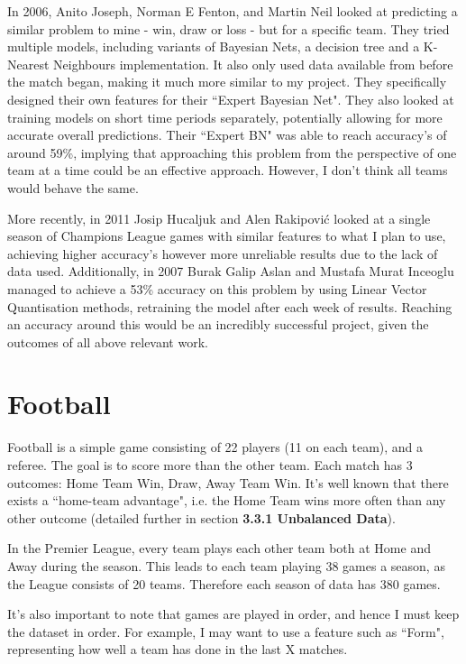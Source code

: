 \documentclass[12pt,a4paper,twoside,openright]{report}
\begin{document}
In 2006, Anito Joseph, Norman E Fenton, and Martin Neil\cite{football-predictor-BNs-spurs} looked at predicting a similar problem to mine - win, draw or loss - but for a specific team. They tried multiple models, including variants of Bayesian Nets, a decision tree and a K-Nearest Neighbours implementation. It also only used data available from before the match began, making it much more similar to my project. They specifically designed their own features for their ``Expert Bayesian Net". They also looked at training models on short time periods separately, potentially allowing for more accurate overall predictions. Their ``Expert BN" was able to reach accuracy's of around 59\%, implying that approaching this problem from the perspective of one team at a time could be an effective approach. However, I don't think all teams would behave the same.

More recently, in 2011 Josip Hucaljuk and Alen Rakipović looked at a single season of Champions League games\cite{football-predictor-ml-techniques} with similar features to what I plan to use, achieving higher accuracy's however more unreliable results due to the lack of data used. Additionally, in 2007 Burak Galip Aslan and Mustafa Murat Inceoglu managed to achieve a 53\% accuracy\cite{soccer-predictor-nns} on this problem by using Linear Vector Quantisation methods, retraining the model after each week of results. Reaching an accuracy around this would be an incredibly successful project, given the outcomes of all above relevant work.

\section{Football}

Football is a simple game consisting of 22 players (11 on each team), and a referee. The goal is to score more than the other team. Each match has 3 outcomes: Home Team Win, Draw, Away Team Win. It's well known that there exists a ``home-team advantage", i.e. the Home Team wins more often than any other outcome (detailed further in section \textbf{3.3.1 Unbalanced Data}). 

In the Premier League, every team plays each other team both at Home and Away during the season. This leads to each team playing 38 games a season, as the League consists of 20 teams. Therefore each season of data has 380 games.

It's also important to note that games are played in order, and hence I must keep the dataset in order. For example, I may want to use a feature such as ``Form", representing how well a team has done in the last X matches.
\end{document}
